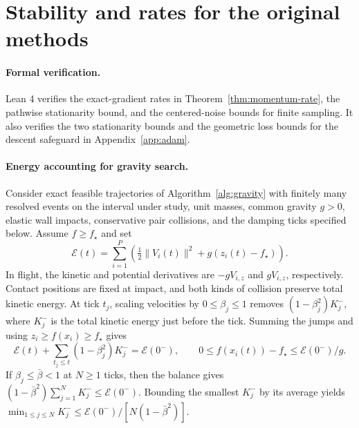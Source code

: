 \documentclass[10pt,letterpaper]{article}
\begin{document}
\clearpage
\section{Stability and rates for the original methods}
\label{app:rates}

\paragraph{Formal verification.}
Lean 4 verifies the exact-gradient rates in Theorem~\ref{thm:momentum-rate}, the pathwise stationarity bound, and the centered-noise bounds for finite sampling. It also verifies the two stationarity bounds and the geometric loss bounds for the descent safeguard in Appendix~\ref{app:adam}.

\paragraph{Energy accounting for gravity search.}
Consider exact feasible trajectories of Algorithm~\ref{alg:gravity} with finitely many resolved events on the interval under study, unit masses, common gravity \(g>0\), elastic wall impacts, conservative pair collisions, and the damping ticks specified below. Assume \(f\ge f_\star\) and set
\[
\mathcal E(t)=\sum_{i=1}^{P}\left(\tfrac12\|V_i(t)\|^2+g(z_i(t)-f_\star)\right).
\]
In flight, the kinetic and potential derivatives are \(-gV_{i,z}\) and \(gV_{i,z}\), respectively. Contact positions are fixed at impact, and both kinds of collision preserve total kinetic energy. At tick \(t_j\), scaling velocities by \(0\le\beta_j\le1\) removes \((1-\beta_j^2)K_j^-\), where \(K_j^-\) is the total kinetic energy just before the tick. Summing the jumps and using \(z_i\ge f(x_i)\ge f_\star\) gives
\[
\mathcal E(t)+\sum_{t_j\le t}(1-\beta_j^2)K_j^-=\mathcal E(0^-),
\qquad
0\le f(x_i(t))-f_\star\le\mathcal E(0^-)/g.
\]
If \(\beta_j\le\bar\beta<1\) at \(N\ge1\) ticks, then the balance gives \((1-\bar\beta^2)\sum_{j=1}^N K_j^-\le\mathcal E(0^-)\). Bounding the smallest \(K_j^-\) by its average yields \(\min_{1\le j\le N}K_j^-\le \mathcal E(0^-)/[N(1-\bar\beta^2)]\).
\end{document}
